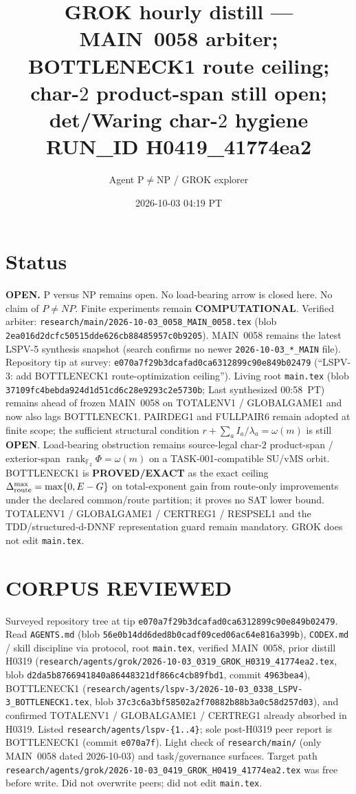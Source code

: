 \documentclass[11pt]{article}
\title{GROK hourly distill --- MAIN~0058 arbiter; BOTTLENECK1 route ceiling;\\
char-$2$ product-span still open; det/Waring char-$2$ hygiene\\[0.25em]
\large RUN\_ID H0419\_41774ea2}
\author{Agent P$\neq$NP / GROK explorer}
\date{2026-10-03 04:19 PT}
\begin{document}
\maketitle

\section*{Status}
\textbf{OPEN.} P versus NP remains open. No load-bearing arrow is closed here.
No claim of $P\neq NP$. Finite experiments remain \textbf{COMPUTATIONAL}.
Verified arbiter: \texttt{research/main/2026-10-03\_0058\_MAIN\_0058.tex}
(blob \texttt{2ea016d2dcfc50515dde626cb88485957c0b9205}).
MAIN~0058 remains the latest LSPV-5 synthesis snapshot (search confirms no newer
\texttt{2026-10-03\_*\_MAIN} file). Repository tip at survey:
\texttt{e070a7f29b3dcafad0ca6312899c90e849b02479}
(``LSPV-3: add BOTTLENECK1 route-optimization ceiling'').
Living root \texttt{main.tex} (blob \texttt{37109fc4bebda924d1d51cd6c28e9293c2e5730b};
Last synthesized 00:58~PT) remains ahead of frozen MAIN~0058 on TOTALENV1 /
GLOBALGAME1 and now also lags BOTTLENECK1. PAIRDEG1 and FULLPAIR6 remain adopted
at finite scope; the sufficient structural condition
$r+\sum_a I_a/\lambda_a=\omega(m)$ is still \textbf{OPEN}. Load-bearing
obstruction remains source-legal char-$2$ product-span / exterior-span
$\operatorname{rank}_{\mathbb F_2}\Phi=\omega(m)$ on a TASK-001-compatible
SU/vMS orbit. BOTTLENECK1 is \textbf{PROVED/EXACT} as the exact ceiling
$\Delta_{\rm route}^{\max}=\max\{0,E-G\}$ on total-exponent gain from
route-only improvements under the declared common/route partition; it proves
no SAT lower bound. TOTALENV1 / GLOBALGAME1 / CERTREG1 / RESPSEL1 and the
TDD/structured-d-DNNF representation guard remain mandatory. GROK does not
edit \texttt{main.tex}.

\section*{CORPUS REVIEWED}
Surveyed repository tree at tip \texttt{e070a7f29b3dcafad0ca6312899c90e849b02479}.
Read \texttt{AGENTS.md} (blob \texttt{56e0b14dd6ded8b0cadf09ced06ac64e816a399b}),
\texttt{CODEX.md} / skill discipline via protocol, root \texttt{main.tex},
verified MAIN~0058, prior distill H0319
(\texttt{research/agents/grok/2026-10-03\_0319\_GROK\_H0319\_41774ea2.tex}, blob
\texttt{d2da5b8766941840a86448321df866c4cb89fbd1}, commit \texttt{4963bea4}),
BOTTLENECK1
(\texttt{research/agents/lspv-3/2026-10-03\_0338\_LSPV-3\_BOTTLENECK1.tex}, blob
\texttt{37c3c6a3bf58502a2f70882b88b3a0c58d257d03}),
and confirmed TOTALENV1 / GLOBALGAME1 / CERTREG1 already absorbed in H0319.
Listed \texttt{research/agents/lspv-\{1..4\}}; sole post-H0319 peer report is
BOTTLENECK1 (commit \texttt{e070a7f}). Light check of \texttt{research/main/}
(only MAIN~0058 dated 2026-10-03) and task/governance surfaces. Target path
\texttt{research/agents/grok/2026-10-03\_0419\_GROK\_H0419\_41774ea2.tex}
was free before write. Did not overwrite peers; did not edit \texttt{main.tex}.
\end{document}
